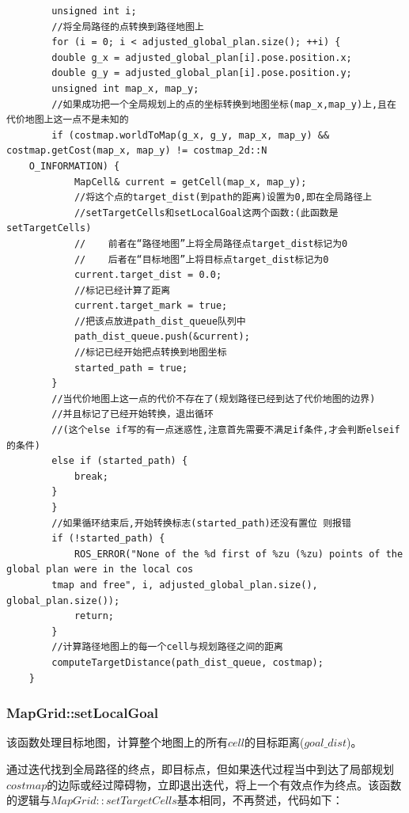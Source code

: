 \documentclass[9pt, oneside]{book}
\begin{document}
\begin{verbatim}
        unsigned int i;
        //将全局路径的点转换到路径地图上
        for (i = 0; i < adjusted_global_plan.size(); ++i) {
        double g_x = adjusted_global_plan[i].pose.position.x;
        double g_y = adjusted_global_plan[i].pose.position.y;
        unsigned int map_x, map_y;
        //如果成功把一个全局规划上的点的坐标转换到地图坐标(map_x,map_y)上,且在代价地图上这一点不是未知的
        if (costmap.worldToMap(g_x, g_y, map_x, map_y) && costmap.getCost(map_x, map_y) != costmap_2d::N
    O_INFORMATION) {
            MapCell& current = getCell(map_x, map_y);
            //将这个点的target_dist(到path的距离)设置为0,即在全局路径上
            //setTargetCells和setLocalGoal这两个函数:(此函数是setTargetCells)
            //    前者在“路径地图”上将全局路径点target_dist标记为0
            //    后者在“目标地图”上将目标点target_dist标记为0
            current.target_dist = 0.0;
            //标记已经计算了距离
            current.target_mark = true;
            //把该点放进path_dist_queue队列中
            path_dist_queue.push(&current);
            //标记已经开始把点转换到地图坐标
            started_path = true;
        }
        //当代价地图上这一点的代价不存在了(规划路径已经到达了代价地图的边界) 
        //并且标记了已经开始转换，退出循环
        //(这个else if写的有一点迷惑性,注意首先需要不满足if条件,才会判断elseif的条件)
        else if (started_path) {
            break;
        }
        }
        //如果循环结束后,开始转换标志(started_path)还没有置位 则报错
        if (!started_path) {
            ROS_ERROR("None of the %d first of %zu (%zu) points of the global plan were in the local cos
        tmap and free", i, adjusted_global_plan.size(), global_plan.size());
            return;
        }
        //计算路径地图上的每一个cell与规划路径之间的距离
        computeTargetDistance(path_dist_queue, costmap);
    }
\end{verbatim}
\normalsize

\subsubsection{MapGrid::setLocalGoal}

该函数处理目标地图，计算整个地图上的所有$cell$的目标距离($goal\_dist$)。

通过迭代找到全局路径的终点，即目标点，但如果迭代过程当中到达了局部规划$costmap$的边际或经过障碍物，立即退出迭代，将上一个有效点作为终点。该函数的逻辑与$MapGrid::setTargetCells$基本相同，不再赘述，代码如下：
\end{document}
